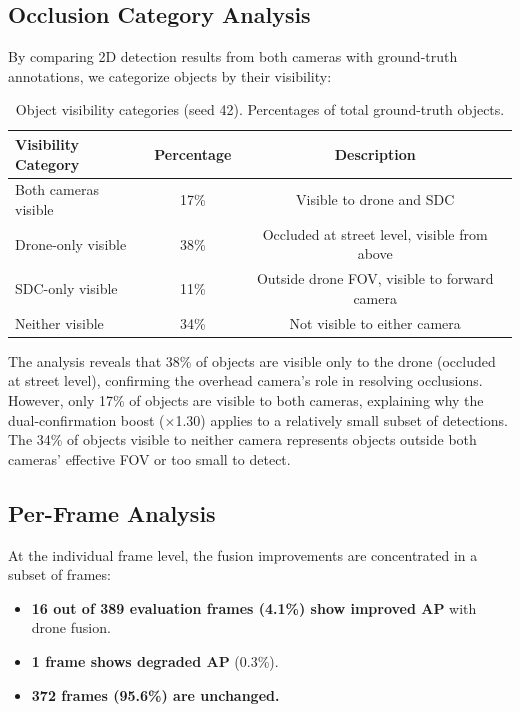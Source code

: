 \documentclass[sustainability,article,submit,moreauthors,pdftex]{Definitions/mdpi}
\begin{document}
\subsection{Occlusion Category Analysis}\label{sec:occlusion}

By comparing 2D detection results from both cameras with ground-truth annotations, we categorize objects by their visibility:

\begin{table}[H]
\caption{Object visibility categories (seed 42). Percentages of total ground-truth objects.}\label{tab:occlusion}
\centering
\begin{tabular}{lcc}
\toprule
\textbf{Visibility Category} & \textbf{Percentage} & \textbf{Description} \\
\midrule
Both cameras visible  & 17\% & Visible to drone and SDC \\
Drone-only visible    & 38\% & Occluded at street level, visible from above \\
SDC-only visible      & 11\% & Outside drone FOV, visible to forward camera \\
Neither visible       & 34\% & Not visible to either camera \\
\bottomrule
\end{tabular}
\end{table}

The analysis reveals that 38\% of objects are visible only to the drone (occluded at street level), confirming the overhead camera's role in resolving occlusions. However, only 17\% of objects are visible to both cameras, explaining why the dual-confirmation boost ($\times$1.30) applies to a relatively small subset of detections. The 34\% of objects visible to neither camera represents objects outside both cameras' effective FOV or too small to detect.

\subsection{Per-Frame Analysis}\label{sec:perframe}

At the individual frame level, the fusion improvements are concentrated in a subset of frames:

\begin{itemize}[leftmargin=*,labelsep=5.8mm]
\item \textbf{16 out of 389 evaluation frames (4.1\%) show improved AP} with drone fusion.
\item \textbf{1 frame shows degraded AP} (0.3\%).
\item \textbf{372 frames (95.6\%) are unchanged.}
\end{itemize}
\end{document}
